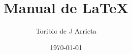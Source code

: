 \newcommand{\HRule}[1]{\rule{\linewidth}{#1}} %
\setcounter{tocdepth}{2}
\setcounter{secnumdepth}{3}

\title{Manual de \LaTeX}
\author{Toribio de J Arrieta}
\date{\today}






